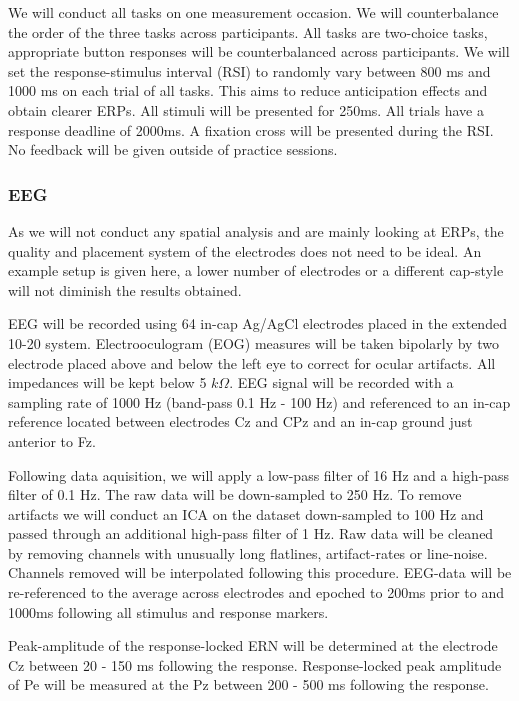 \documentclass[
  man,floatsintext]{apa7}
\begin{document}
We will conduct all tasks on one measurement occasion. We will counterbalance the order of the three tasks across participants. All tasks are two-choice tasks, appropriate button responses will be counterbalanced across participants. We will set the response-stimulus interval (RSI) to randomly vary between 800 ms and 1000 ms on each trial of all tasks. This aims to reduce anticipation effects and obtain clearer ERPs. All stimuli will be presented for 250ms. All trials have a response deadline of 2000ms. A fixation cross will be presented during the RSI. No feedback will be given outside of practice sessions.

\hypertarget{eeg}{%
\subsubsection{EEG}\label{eeg}}

As we will not conduct any spatial analysis and are mainly looking at ERPs, the quality and placement system of the electrodes does not need to be ideal. An example setup is given here, a lower number of electrodes or a different cap-style will not diminish the results obtained.

EEG will be recorded using 64 in-cap Ag/AgCl electrodes placed in the extended 10-20 system. Electrooculogram (EOG) measures will be taken bipolarly by two electrode placed above and below the left eye to correct for ocular artifacts. All impedances will be kept below 5 \(k\Omega\). EEG signal will be recorded with a sampling rate of 1000 Hz (band-pass 0.1 Hz - 100 Hz) and referenced to an in-cap reference located between electrodes Cz and CPz and an in-cap ground just anterior to Fz.

Following data aquisition, we will apply a low-pass filter of 16 Hz and a high-pass filter of 0.1 Hz. The raw data will be down-sampled to 250 Hz. To remove artifacts we will conduct an ICA on the dataset down-sampled to 100 Hz and passed through an additional high-pass filter of 1 Hz. Raw data will be cleaned by removing channels with unusually long flatlines, artifact-rates or line-noise. Channels removed will be interpolated following this procedure. EEG-data will be re-referenced to the average across electrodes and epoched to 200ms prior to and 1000ms following all stimulus and response markers.

Peak-amplitude of the response-locked ERN will be determined at the electrode Cz between 20 - 150 ms following the response. Response-locked peak amplitude of Pe will be measured at the Pz between 200 - 500 ms following the response.
\end{document}
